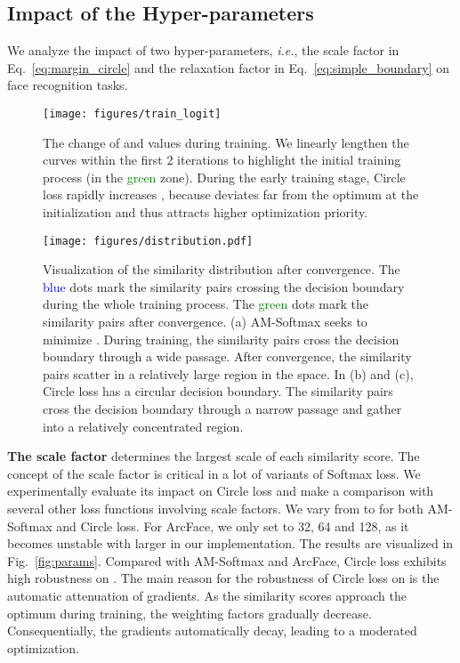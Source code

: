 \documentclass[10pt,twocolumn,letterpaper]{article}
\begin{document}
\subsection{Impact of the Hyper-parameters}\label{sec:exp_param}
We analyze the impact of two hyper-parameters, \emph{i.e.}, the scale factor  in Eq.~\ref{eq:margin_circle} and the relaxation factor  in Eq.~\ref{eq:simple_boundary} on face recognition tasks. 



\begin{figure}[t]
    \centering
    \texttt{[image: figures/train\_logit]}
    \caption{The change of  and  values during training. We linearly lengthen the curves within the first 2 iterations to highlight the initial training process (in the \textcolor{green}{green} zone). During the early training stage, Circle loss rapidly increases , because  deviates far from the optimum at the initialization and thus attracts higher optimization priority.}
    \label{fig:logit-train}
\end{figure}


\begin{figure*}[ht]
\centering
  \texttt{[image: figures/distribution.pdf]}
\caption{Visualization of the similarity distribution after convergence. The \textcolor{blue}{blue} dots mark the similarity pairs crossing the decision boundary during the whole training process. The \textcolor{green}{green} dots mark the similarity pairs after convergence. (a) AM-Softmax seeks to minimize . During training, the similarity pairs cross the decision boundary through a wide passage. After convergence, the similarity pairs scatter in a relatively large region in the  space. In (b) and (c), Circle loss has a circular decision boundary. The similarity pairs cross the decision boundary through a narrow passage and gather into a relatively concentrated region. }
\label{fig:scatter}
\end{figure*}

\textbf{The scale factor } determines the largest scale of each similarity score. The concept of the scale factor is critical in a lot of variants of Softmax loss. We experimentally evaluate its impact on Circle loss and make a comparison with several other loss functions involving scale factors. We vary  from  to  for both AM-Softmax and Circle loss. For ArcFace, we only set  to 32, 64 and 128, as it becomes unstable with larger  in our implementation. The results are visualized in Fig.~\ref{fig:params}. Compared with AM-Softmax and ArcFace, Circle loss exhibits high robustness on . The main reason for the robustness of Circle loss on  is the automatic attenuation of gradients. As the similarity scores approach the optimum during training, the weighting factors gradually decrease. Consequentially, the gradients automatically decay, leading to a moderated optimization.
\end{document}
